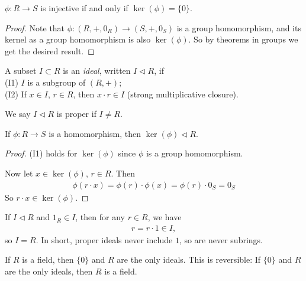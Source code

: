 \documentclass[a4paper]{article}
\begin{document}
\begin{lemma}
$\phi:R \to S$ is injective if and only if $\ker(\phi) = \{0\}$.
\begin{proof}
Note that $\phi:(R,+,0_R) \to (S,+,0_S)$ is a group homomorphism, and its kernel as a group homomorphism is also $\ker(\phi)$. So by theorems in groups we get the desired result.
\end{proof}
\end{lemma}

\begin{defi}
A subset $I \subset R$ is an \emph{ideal}, written $I \triangleleft R$, if\\
(I1) $I$ is a subgroup of $(R,+)$;\\
(I2) If $x \in I$, $r \in R$, then $x \cdot r \in I$ (strong multiplicative closure).

We say $I \triangleleft R$ is proper if $I \neq R$.
\end{defi}

\begin{lemma}
If $\phi:R \to S$ is a homomorphism, then $\ker(\phi) \triangleleft R$.
\begin{proof}
(I1) holds for $\ker(\phi)$ since $\phi$ is a group homomorphism. 

Now let $x \in \ker(\phi)$, $r \in R$. Then
\begin{equation*}
\begin{aligned}
\phi(r \cdot x) = \phi(r) \cdot \phi(x) = \phi(r) \cdot 0_S = 0_S
\end{aligned}
\end{equation*}
So $r \cdot x \in \ker(\phi)$.
\end{proof}
\end{lemma}

\begin{eg}
If $I \triangleleft R$ and $1_R \in I$, then for any $r \in R$, we have
\begin{equation*}
\begin{aligned}
r = r \cdot 1 \in I,
\end{aligned}
\end{equation*}
so $I=R$. In short, proper ideals never include $1$, so are never subrings.
\end{eg}

\begin{eg}
If $R$ is a field, then $\{0\}$ and $R$ are the only ideals. This is reversible: If $\{0\}$ and $R$ are the only ideals, then $R$ is a field.
\end{eg}
\end{document}
